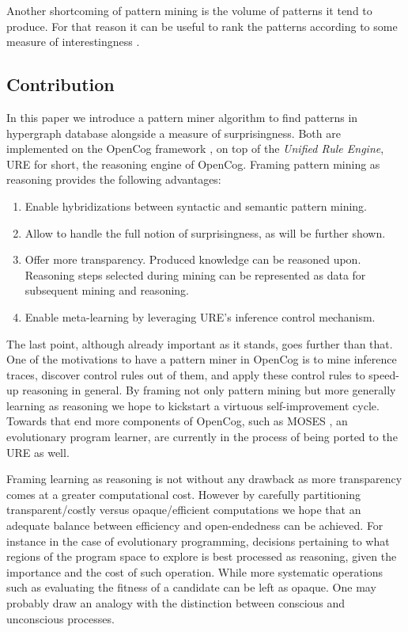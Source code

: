\documentclass[runningheads]{llncs}
\begin{document}
Another shortcoming of pattern mining is the volume of patterns it
tend to produce. For that reason it can be useful to rank the patterns
according to some measure of interestingness \cite{Vreeken2014}.

\subsection{Contribution}

In this paper we introduce a pattern miner algorithm to find patterns
in hypergraph database alongside a measure of surprisingness. Both are
implemented on the OpenCog framework \cite{Goertzel2014}, on top of the
\emph{Unified Rule Engine}, URE for short, the reasoning engine of
OpenCog. Framing pattern mining as reasoning provides the following
advantages:
\begin{enumerate}
\item Enable hybridizations between syntactic and semantic pattern
  mining.
\item Allow to handle the full notion of surprisingness, as will be
  further shown.
\item Offer more transparency. Produced knowledge can be reasoned
  upon. Reasoning steps selected during mining can be represented as
  data for subsequent mining and reasoning.
\item Enable meta-learning by leveraging URE's inference control
  mechanism.
\end{enumerate}
The last point, although already important as it stands, goes further
than that. One of the motivations to have a pattern miner in OpenCog
is to mine inference traces, discover control rules out of them, and
apply these control rules to speed-up reasoning in general. By framing
not only pattern mining but more generally learning as reasoning we
hope to kickstart a virtuous self-improvement cycle. Towards that end
more components of OpenCog, such as MOSES
\cite{Looks06abstractcompetent}, an evolutionary program learner, are
currently in the process of being ported to the URE as well.

Framing learning as reasoning is not without any drawback as more
transparency comes at a greater computational cost. However by
carefully partitioning transparent/costly versus opaque/efficient
computations we hope that an adequate balance between efficiency and
open-endedness can be achieved. For instance in the case of
evolutionary programming, decisions pertaining to what regions of the
program space to explore is best processed as reasoning, given the
importance and the cost of such operation. While more systematic
operations such as evaluating the fitness of a candidate can be left
as opaque. One may probably draw an analogy with the distinction
between conscious and unconscious processes.
\end{document}
